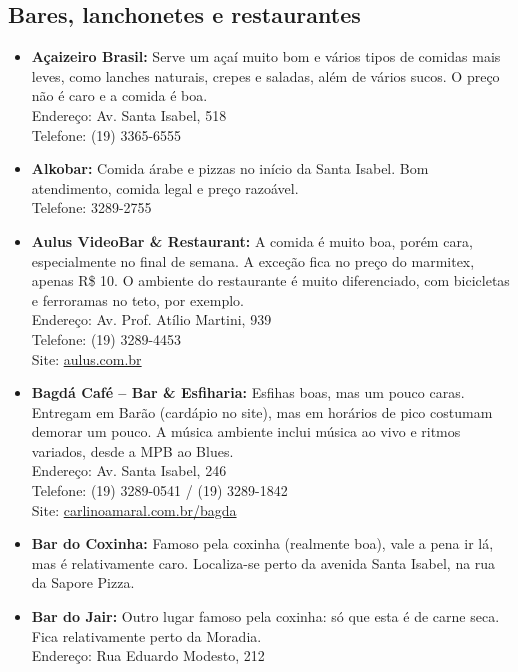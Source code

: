 \subsection{Bares, lanchonetes e restaurantes}
\begin{itemize}
\item   \textbf{Açaizeiro Brasil:} Serve um açaí muito bom e vários tipos de
        comidas mais leves, como lanches naturais, crepes e saladas, além de
        vários sucos. O preço não é caro e a comida é boa.
        \\Endereço: Av. Santa Isabel, 518
        \\Telefone: (19) 3365-6555

\item   \textbf{Alkobar:} Comida árabe e pizzas no início da Santa Isabel. Bom
        atendimento, comida legal e preço razoável.
        \\Telefone: 3289-2755

\item   \textbf{Aulus VideoBar \& Restaurant:} A comida é muito boa, porém cara,
        especialmente no final de semana. A exceção fica no preço do marmitex,
        apenas R\$ 10. O ambiente do restaurante é muito diferenciado, com
        bicicletas e ferroramas no teto, por exemplo.
        \\Endereço: Av. Prof. Atílio Martini, 939
        \\Telefone: (19) 3289-4453
        \\Site: \url{aulus.com.br}

\item   \textbf{Bagdá Café -- Bar \& Esfiharia:} Esfihas boas, mas um pouco
        caras. Entregam em Barão (cardápio no site), mas em horários de pico
        costumam demorar um pouco. A música ambiente inclui música ao vivo e
        ritmos variados, desde a MPB ao Blues.
        \\Endereço: Av. Santa Isabel, 246
        \\Telefone: (19) 3289-0541 / (19) 3289-1842
        \\Site: \url{carlinoamaral.com.br/bagda}

\item   \textbf{Bar do Coxinha:} Famoso pela coxinha (realmente boa), vale a
        pena ir lá, mas é relativamente caro. Localiza-se perto da avenida Santa
        Isabel, na rua da Sapore Pizza.

\item   \textbf{Bar do Jair:} Outro lugar famoso pela coxinha: só que esta é de
        carne seca. Fica relativamente perto da Moradia.
        \\Endereço: Rua Eduardo Modesto, 212


\end{itemize}
